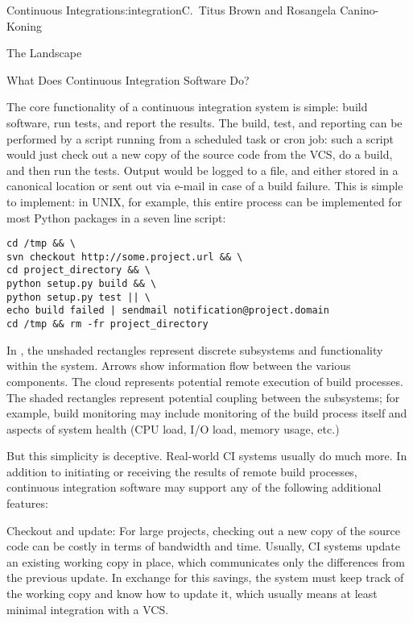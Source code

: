 \begin{aosachapter}{Continuous Integration}{s:integration}{C.\ Titus Brown and Rosangela Canino-Koning}
\begin{aosasect1}{The Landscape}
\begin{aosasect2}{What Does Continuous Integration Software Do?}

The core functionality of a continuous integration system is simple:
build software, run tests, and report the results. The build, test,
and reporting can be performed by a script running from a scheduled
task or cron job: such a script would just check out a new copy of the
source code from the VCS, do a build, and then run the tests. Output
would be logged to a file, and either stored in a canonical location
or sent out via e-mail in case of a build failure. This is simple to
implement: in UNIX, for example, this entire process can be
implemented for most Python packages in a seven line script:

\begin{verbatim}
cd /tmp && \
svn checkout http://some.project.url && \
cd project_directory && \
python setup.py build && \
python setup.py test || \
echo build failed | sendmail notification@project.domain
cd /tmp && rm -fr project_directory
\end{verbatim}

In , the unshaded rectangles
represent discrete subsystems and functionality within the system.
Arrows show information flow between the various components.  The
cloud represents potential remote execution of build processes.  The
shaded rectangles represent potential coupling between the subsystems;
for example, build monitoring may include monitoring of the build
process itself and aspects of system health (CPU load, I/O load,
memory usage, etc.)


But this simplicity is deceptive. Real-world CI systems usually
do much more. In addition to initiating or receiving the results of
remote build processes, continuous integration software may support
any of the following additional features:

\begin{aosadescription}

  \item{Checkout and update:} For large projects, checking out a
  new copy of the source code can be costly in terms of bandwidth
  and time. Usually, CI systems update an existing working copy in
  place, which communicates only the differences from the previous
  update. In exchange for this savings, the system must keep track
  of the working copy and know how to update it, which usually means
  at least minimal integration with a VCS.


\end{aosadescription}
\end{aosasect2}
\end{aosasect1}
\end{aosachapter}

